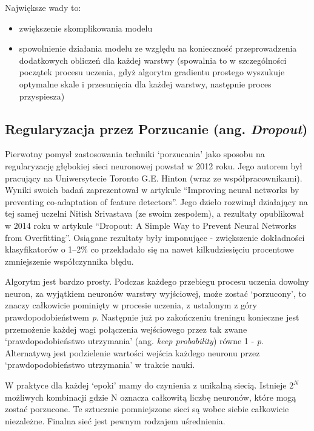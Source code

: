 \documentclass[a4paper,12pt]{article}
\numberwithin{figure}{section}
\begin{document}
    \bigskip

    Największe wady to\cite{UczenieMaszynowe2018}:
    \begin{itemize}
        \item zwiększenie skomplikowania modelu
        \item spowolnienie działania modelu ze względu na konieczność przeprowadzenia dodatkowych obliczeń dla każdej warstwy (spowalnia to w szczególności początek procesu uczenia, gdyż algorytm gradientu prostego wyszukuje optymalne skale i przesunięcia dla każdej warstwy, następnie proces przyspiesza)
    \end{itemize}

    \subsection{Regularyzacja przez Porzucanie (ang. \textit{Dropout})}

    Pierwotny pomysł zastosowania techniki `porzucania' jako sposobu na regularyzację głębokiej sieci neuronowej powstał w 2012 roku. Jego autorem był pracujący na Uniwersytecie Toronto G.E. Hinton (wraz ze współpracownikami). Wyniki swoich badań zaprezentował w artykule ``Improving neural networks by preventing co-adaptation of feature detectors''\cite{ImprovingNeuralNetworks2012}. Jego dzieło rozwinął działający na tej samej uczelni Nitish Srivastava (ze swoim zespołem), a rezultaty opublikował w 2014 roku w artykule ``Dropout: A Simple Way to Prevent Neural Networks from Overfitting''\cite{Dropout2014}. Osiągane rezultaty były imponujące - zwiększenie dokładności klasyfikatorów o 1--2\% co przekładało się na nawet kilkudziesięciu procentowe zmniejszenie współczynnika błędu.

    \bigskip

    Algorytm jest bardzo prosty. Podczas każdego przebiegu procesu uczenia dowolny neuron, za wyjątkiem neuronów warstwy wyjściowej, może zostać `porzucony', to znaczy całkowicie pominięty w procesie uczenia, z ustalonym z góry prawdopodobieństwem \textit{p}. Następnie już po zakończeniu treningu konieczne jest przemożenie każdej wagi połączenia wejściowego przez tak zwane `prawdopodobieństwo utrzymania' (ang. \textit{keep probability}) równe 1 - \textit{p}. Alternatywą jest podzielenie wartości wejścia każdego neuronu przez `prawdopodobieństwo utrzymania' w trakcie nauki\cite{UczenieMaszynowe2018}.

    \bigskip

    W praktyce dla każdej `epoki' mamy do czynienia z unikalną siecią. Istnieje $2^{N}$ możliwych kombinacji gdzie N oznacza całkowitą liczbę neuronów, które mogą zostać porzucone. Te sztucznie pomniejszone sieci są wobec siebie całkowicie niezależne. Finalna sieć jest pewnym rodzajem uśrednienia\cite{UczenieMaszynowe2018}.
\end{document}
